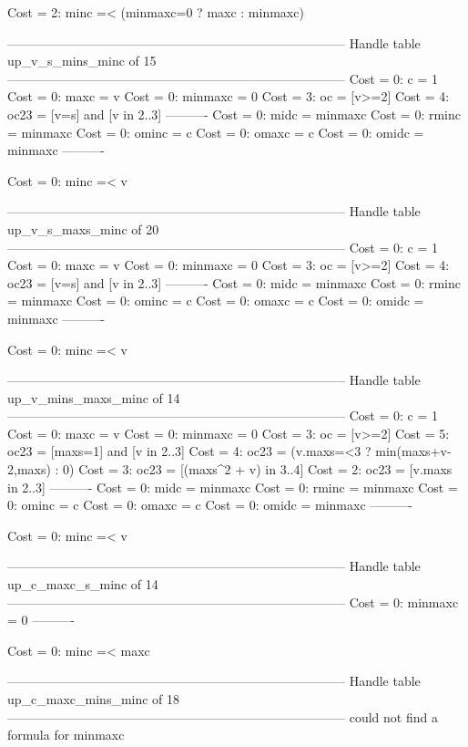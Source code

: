 Cost =  2:  minc =< (minmaxc=0 ? maxc : minmaxc)

--------------------------------------------------------------------------------
Handle table up_v_s_mins_minc of 15
--------------------------------------------------------------------------------
Cost =  0:  c       = 1
Cost =  0:  maxc    = v
Cost =  0:  minmaxc = 0
Cost =  3:  oc      = [v>=2]
Cost =  4:  oc23    = [v=s] and [v in 2..3]
----------
Cost =  0:  midc    = minmaxc
Cost =  0:  rminc   = minmaxc
Cost =  0:  ominc   = c
Cost =  0:  omaxc   = c
Cost =  0:  omidc   = minmaxc
----------

Cost =  0:  minc =< v

--------------------------------------------------------------------------------
Handle table up_v_s_maxs_minc of 20
--------------------------------------------------------------------------------
Cost =  0:  c       = 1
Cost =  0:  maxc    = v
Cost =  0:  minmaxc = 0
Cost =  3:  oc      = [v>=2]
Cost =  4:  oc23    = [v=s] and [v in 2..3]
----------
Cost =  0:  midc    = minmaxc
Cost =  0:  rminc   = minmaxc
Cost =  0:  ominc   = c
Cost =  0:  omaxc   = c
Cost =  0:  omidc   = minmaxc
----------

Cost =  0:  minc =< v

--------------------------------------------------------------------------------
Handle table up_v_mins_maxs_minc of 14
--------------------------------------------------------------------------------
Cost =  0:  c       = 1
Cost =  0:  maxc    = v
Cost =  0:  minmaxc = 0
Cost =  3:  oc      = [v>=2]
Cost =  5:  oc23    = [maxs=1] and [v in 2..3]
Cost =  4:  oc23    = (v.maxs=<3 ? min(maxs+v-2,maxs) : 0)
Cost =  3:  oc23    = [(maxs^2 + v) in 3..4]
Cost =  2:  oc23    = [v.maxs in 2..3]
----------
Cost =  0:  midc    = minmaxc
Cost =  0:  rminc   = minmaxc
Cost =  0:  ominc   = c
Cost =  0:  omaxc   = c
Cost =  0:  omidc   = minmaxc
----------

Cost =  0:  minc =< v

--------------------------------------------------------------------------------
Handle table up_c_maxc_s_minc of 14
--------------------------------------------------------------------------------
Cost =  0:  minmaxc = 0
----------

Cost =  0:  minc =< maxc

--------------------------------------------------------------------------------
Handle table up_c_maxc_mins_minc of 18
--------------------------------------------------------------------------------
could not find a formula for minmaxc

